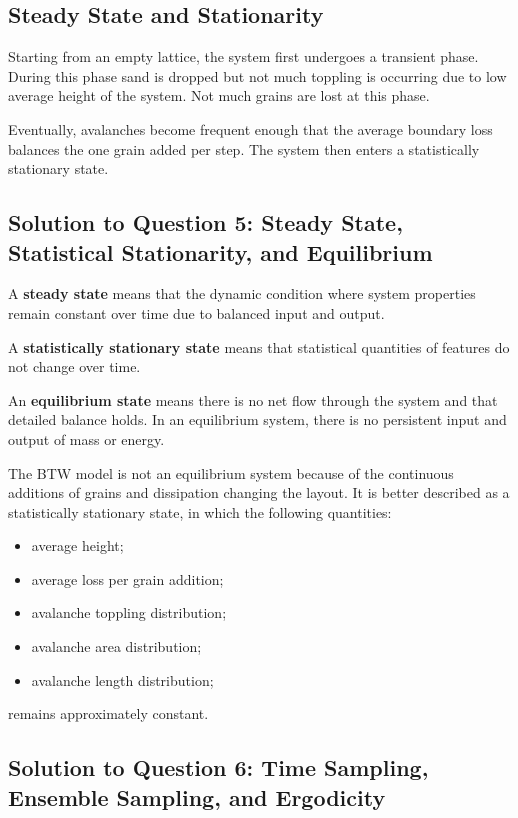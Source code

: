 \documentclass[11pt]{article}
\begin{document}
\subsection{Steady State and Stationarity}

Starting from an empty lattice, the system first undergoes a transient phase. 
During this phase sand is dropped but not much toppling is occurring due to low average height of the system. Not much grains are lost at this phase.

Eventually, avalanches become frequent enough that the average boundary loss balances the one grain added per step. The system then enters a statistically stationary state. 

\subsection{Solution to Question 5: Steady State, Statistical Stationarity, and Equilibrium}

A \textbf{steady state} means that the dynamic condition where system properties remain constant over time due to balanced input and output.

A \textbf{statistically stationary state} means that statistical quantities of features do not change over time. 

An \textbf{equilibrium state} means there is no net flow through the system and that detailed balance holds. 
In an equilibrium system, there is no persistent input and output of mass or energy.

The BTW model is not an equilibrium system because of the continuous additions of grains and dissipation changing the layout.
It is better described as a statistically stationary state, in which the following quantities:

\begin{itemize}
    \item average height;
    \item average loss per grain addition;
    \item avalanche toppling distribution;
    \item avalanche area distribution;
    \item avalanche length distribution;
\end{itemize}

remains approximately constant.

\subsection{Solution to Question 6: Time Sampling, Ensemble Sampling, and Ergodicity}
\end{document}
